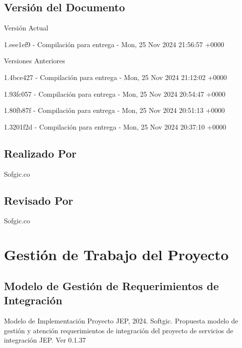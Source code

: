 \documentclass[
  paper=a4,
  ,captions=tableheading
]{scrartcl}
\renewenvironment{quote}{\begin{customblockquote}\list{}{\rightmargin=0em\leftmargin=0em}%
\item\relax\color{blockquote-text}\ignorespaces}{\unskip\unskip\endlist\end{customblockquote}}
\begin{document}
\subsection{Versión del Documento}\label{sec:versiuxf3n-del-documento}

\begin{quote}
\end{quote}

Versión Actual

1.eee1ef9 - Compilación para entrega - Mon, 25 Nov 2024 21:56:57 +0000

Versiones Anteriores

1.4bce427 - Compilación para entrega - Mon, 25 Nov 2024 21:12:02 +0000

1.93fc057 - Compilación para entrega - Mon, 25 Nov 2024 20:54:47 +0000

1.80fb87f - Compilación para entrega - Mon, 25 Nov 2024 20:51:13 +0000

1.3201f2d - Compilación para entrega - Mon, 25 Nov 2024 20:37:10 +0000

\subsection{Realizado Por}\label{sec:realizado-por}

Sofgic.co

\subsection{Revisado Por}\label{sec:revisado-por}

Sofgic.co

\newpage

\section{Gestión de Trabajo del
Proyecto}\label{sec:gestiuxf3n-de-trabajo-del-proyecto}

\subsection{Modelo de Gestión de Requerimientos de
Integración}\label{sec:modelo-de-gestiuxf3n-de-requerimientos-de-integraciuxf3n}

\begin{quote}
Modelo de Implementación Proyecto JEP, 2024. Softgic. Propuesta modelo
de gestión y atención requerimientos de integración del proyecto de
servicios de integración JEP. Ver 0.1.37
\end{quote}
\end{document}
